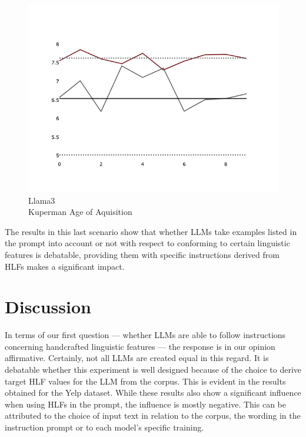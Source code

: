 \documentclass[11pt]{article}
\begin{document}
\begin{figure}[ht]
\begin{minipage}{0.32\textwidth}
        \label{fig-p2-ifd-gemini-twords}
    \end{minipage}
    \hfill
    \begin{minipage}{0.32\textwidth}
        \includegraphics[width=\linewidth]{plots/prompt_2_ifd/prompt_2-llama3_70b-cnn_dailymail/prompt_2-llama3_70b-cnn_dailymail_a_kup_pw.png}
        \caption[center]{Llama3\\Kuperman Age of Aquisition}
        \label{fig-p2-ifd-llama3-a-kup-pw}
    \end{minipage}
\end{figure}

The results in this last scenario show that whether LLMs take examples listed in
the prompt into account or not with respect to conforming to certain linguistic
features is debatable, providing them with specific instructions derived from
HLFs makes a significant impact.

\section{Discussion}

In terms of our first question --- whether LLMs are able to follow instructions
concerning handcrafted linguistic features --- the response is in our opinion
affirmative.
Certainly, not all LLMs are created equal in this regard.
It is debatable whether this experiment is well designed because of the choice
to derive target HLF values for the LLM from the corpus.
This is evident in the results obtained for the Yelp dataset.
While these results also show a significant influence when using HLFs in the
prompt, the influence is mostly negative.
This can be attributed to the choice of input text in relation to the corpus,
the wording in the instruction prompt or to each model's specific training.
\end{document}
